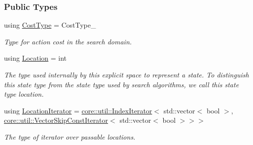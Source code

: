 \subsubsection*{Public Types}
\begin{DoxyCompactItemize}
\item 
using \hyperlink{structslb_1_1ext_1_1explicit__space_1_1Grid_a800819a8f2c96bf76dd9d36c18760815}{Cost\+Type} = Cost\+Type\+\_\+\hypertarget{structslb_1_1ext_1_1explicit__space_1_1Grid_a800819a8f2c96bf76dd9d36c18760815}{}\label{structslb_1_1ext_1_1explicit__space_1_1Grid_a800819a8f2c96bf76dd9d36c18760815}

\begin{DoxyCompactList}\small\item\em Type for action cost in the search domain. \end{DoxyCompactList}\item 
using \hyperlink{structslb_1_1ext_1_1explicit__space_1_1Grid_a2b2125f1774b299ea7f0f9f21d967fde}{Location} = int\hypertarget{structslb_1_1ext_1_1explicit__space_1_1Grid_a2b2125f1774b299ea7f0f9f21d967fde}{}\label{structslb_1_1ext_1_1explicit__space_1_1Grid_a2b2125f1774b299ea7f0f9f21d967fde}

\begin{DoxyCompactList}\small\item\em The type used internally by this explicit space to represent a state. To distinguish this state type from the state type used by search algorithms, we call this state type {\ttfamily location}. \end{DoxyCompactList}\item 
using \hyperlink{structslb_1_1ext_1_1explicit__space_1_1Grid_a75c71647e997ddb8f8f442d4e173d962}{Location\+Iterator} = \hyperlink{structslb_1_1core_1_1util_1_1IndexIterator}{core\+::util\+::\+Index\+Iterator}$<$ std\+::vector$<$ bool $>$, \hyperlink{namespaceslb_1_1core_1_1util_a5692b540118495a35ebae95fb8b80790}{core\+::util\+::\+Vector\+Skip\+Const\+Iterator}$<$ std\+::vector$<$ bool $>$$>$$>$\hypertarget{structslb_1_1ext_1_1explicit__space_1_1Grid_a75c71647e997ddb8f8f442d4e173d962}{}\label{structslb_1_1ext_1_1explicit__space_1_1Grid_a75c71647e997ddb8f8f442d4e173d962}

\begin{DoxyCompactList}\small\item\em The type of iterator over passable locations. \end{DoxyCompactList}\end{DoxyCompactItemize}
